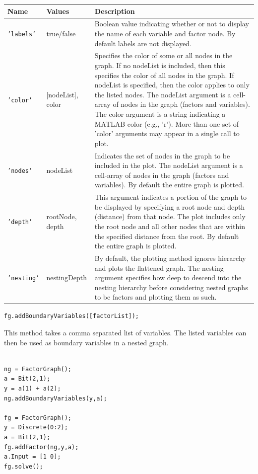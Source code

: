 \begin{longtable} {l p{3cm} p{10cm}}
Name & Values & Description \\
\hline
\endhead
\texttt{'labels'} & true/false & Boolean value indicating whether or not to display the name of each variable and factor node.  By default labels are not displayed. \\
\texttt{'color'} & [nodeList], color & Specifies the color of some or all nodes in the graph.  If no nodeList is included, then this specifies the color of all nodes in the graph.  If nodeList is specified, then the color applies to only the listed nodes.  The nodeList argument is a cell-array of nodes in the graph (factors and variables).  The color argument is a string indicating a MATLAB color (e.g., 'r').  More than one set of 'color' arguments may appear in a single call to plot. \\ 
\texttt{'nodes'} & nodeList & Indicates the set of nodes in the graph to be included in the plot.  The nodeList argument is a cell-array of nodes in the graph (factors and variables).  By default the entire graph is plotted.  \\
\texttt{'depth'} & rootNode, depth & This argument indicates a portion of the graph to be displayed by specifying a root node and depth (distance) from that node.  The plot includes only the root node and all other nodes that are within the specified distance from the root.  By default the entire graph is plotted.  \\
\texttt{'nesting'} & nestingDepth & By default, the plotting method ignores hierarchy and plots the flattened graph.  The nesting argument specifies how deep to descend into the nesting hierarchy before considering nested graphs to be factors and plotting them as such. \\
\end{longtable}

\fi

\begin{lstlisting}
fg.addBoundaryVariables([factorList]);
\end{lstlisting}

This method takes a comma separated list of variables. The listed variables can then be used as boundary variables in a nested graph.

\ifmatlab
\begin{lstlisting}

ng = FactorGraph();
a = Bit(2,1);
y = a(1) + a(2);
ng.addBoundaryVariables(y,a);

fg = FactorGraph(); 
y = Discrete(0:2);
a = Bit(2,1);
fg.addFactor(ng,y,a);
a.Input = [1 0];
fg.solve();

\end{lstlisting}
\fi

